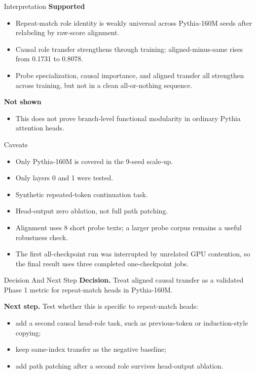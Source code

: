 \documentclass[aspectratio=169]{beamer}
\begin{document}
\begin{frame}{Interpretation}
  \textbf{Supported}
  \begin{itemize}
    \item Repeat-match role identity is weakly universal across Pythia-160M
    seeds after relabeling by raw-score alignment.
    \item Causal role transfer strengthens through training:
    aligned-minus-same rises from 0.1731 to 0.8078.
    \item Probe specialization, causal importance, and aligned transfer all
    strengthen across training, but not in a clean all-or-nothing sequence.
  \end{itemize}

  \vspace{0.6em}
  \textbf{Not shown}
  \begin{itemize}
    \item This does not prove branch-level functional modularity in ordinary
    Pythia attention heads.
  \end{itemize}
\end{frame}

\begin{frame}{Caveats}
  \begin{itemize}
    \item Only Pythia-160M is covered in the 9-seed scale-up.
    \item Only layers 0 and 1 were tested.
    \item Synthetic repeated-token continuation task.
    \item Head-output zero ablation, not full path patching.
    \item Alignment uses 8 short probe texts; a larger probe corpus remains a
    useful robustness check.
    \item The first all-checkpoint run was interrupted by unrelated GPU
    contention, so the final result uses three completed one-checkpoint jobs.
  \end{itemize}
\end{frame}

\begin{frame}{Decision And Next Step}
  \textbf{Decision.} Treat aligned causal transfer as a validated Phase 1
  metric for repeat-match heads in Pythia-160M.

  \vspace{0.8em}
  \textbf{Next step.}
  Test whether this is specific to repeat-match heads:

  \begin{itemize}
    \item add a second causal head-role task, such as previous-token or
    induction-style copying;
    \item keep same-index transfer as the negative baseline;
    \item add path patching after a second role survives head-output ablation.
  \end{itemize}
\end{frame}
\end{document}
